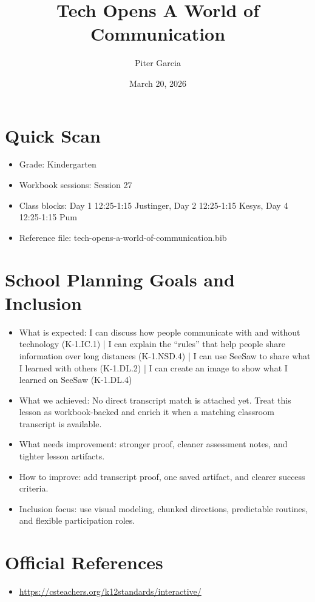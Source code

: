 \documentclass[11pt]{article}
\title{Tech Opens A World of Communication}
\author{Piter Garcia}
\date{March 20, 2026}
\begin{document}
\maketitle
\section*{Quick Scan}
\begin{itemize}[leftmargin=*]
\item Grade: Kindergarten
\item Workbook sessions: Session 27
\item Class blocks: Day 1 12:25-1:15 Justinger, Day 2 12:25-1:15 Kesys, Day 4 12:25-1:15 Pum
\item Reference file: tech-opens-a-world-of-communication.bib
\end{itemize}
\section*{School Planning Goals and Inclusion}
\begin{itemize}[leftmargin=*]
\item What is expected: I can discuss how people communicate with and without technology (K-1.IC.1) | I can explain the “rules” that help people share information over long distances (K-1.NSD.4) | I can use SeeSaw to share what I learned with others (K-1.DL.2) | I can create an image to show what I learned on SeeSaw (K-1.DL.4)
\item What we achieved: No direct transcript match is attached yet. Treat this lesson as workbook-backed and enrich it when a matching classroom transcript is available.
\item What needs improvement: stronger proof, cleaner assessment notes, and tighter lesson artifacts.
\item How to improve: add transcript proof, one saved artifact, and clearer success criteria.
\item Inclusion focus: use visual modeling, chunked directions, predictable routines, and flexible participation roles.
\end{itemize}
\section*{Official References}
\begin{itemize}[leftmargin=*]
\item \url{https://csteachers.org/k12standards/interactive/}

\end{itemize}
\end{document}
